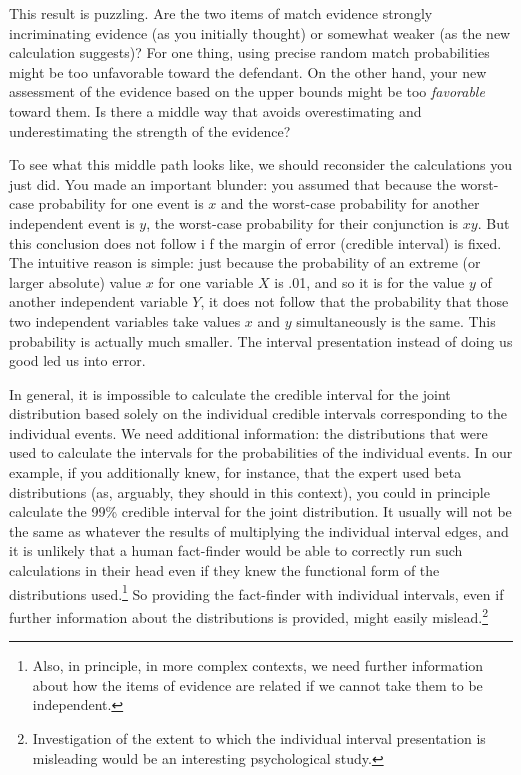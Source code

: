 \documentclass[
  10pt,
  dvipsnames,enabledeprecatedfontcommands]{scrartcl}
\begin{document}
This result is puzzling. Are the two items of match evidence strongly
incriminating evidence (as you initially thought) or somewhat weaker (as
the new calculation suggests)? For one thing, using precise random match
probabilities might be too unfavorable toward the defendant. On the
other hand, your new assessment of the evidence based on the upper
bounds might be too \emph{favorable} toward them. Is there a middle way
that avoids overestimating and underestimating the strength of the
evidence?

To see what this middle path looks like, we should reconsider the
calculations you just did. You made an important blunder: you assumed
that because the worst-case probability for one event is \(x\) and the
worst-case probability for another independent event is \(y\), the
worst-case probability for their conjunction is \(xy\). But this
conclusion does not follow i f the margin of error (credible interval)
is fixed. The intuitive reason is simple: just because the probability
of an extreme (or larger absolute) value \(x\) for one variable \(X\) is
.01, and so it is for the value \(y\) of another independent variable
\(Y\), it does not follow that the probability that those two
independent variables take values \(x\) and \(y\) simultaneously is the
same. This probability is actually much smaller. The interval
presentation instead of doing us good led us into error.

In general, it is impossible to calculate the credible interval for the
joint distribution based solely on the individual credible intervals
corresponding to the individual events. We need additional information:
the distributions that were used to calculate the intervals for the
probabilities of the individual events. In our example, if you
additionally knew, for instance, that the expert used beta distributions
(as, arguably, they should in this context), you could in principle
calculate the 99\% credible interval for the joint distribution. It
usually will not be the same as whatever the results of multiplying the
individual interval edges, and it is unlikely that a human fact-finder
would be able to correctly run such calculations in their head even if
they knew the functional form of the distributions used.\footnote{Also,
  in principle, in more complex contexts, we need further information
  about how the items of evidence are related if we cannot take them to
  be independent.} So providing the fact-finder with individual
intervals, even if further information about the distributions is
provided, might easily mislead.\footnote{Investigation of the extent to
  which the individual interval presentation is misleading would be an
  interesting psychological study.}
\end{document}
